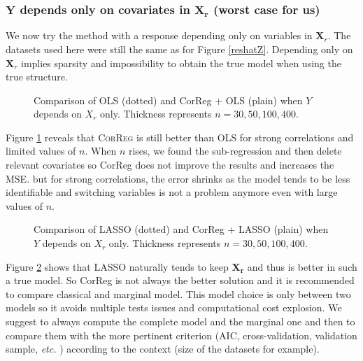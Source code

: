 \documentclass[11pt,a4paper]{article}
\begin{document}
\FloatBarrier
	\subsubsection{$\boldsymbol{Y}$ depends only on covariates in $\boldsymbol{X_r}$ (worst case for us)}	 \label{tableMSEsimgauche}
We now try the method with a response depending only on variables in $\boldsymbol{X}_r$. The datasets used here were still the same as for Figure \ref{reshatZ}.
Depending only on $\boldsymbol{X}_r$ implies sparsity and impossibility to obtain the true model when using the true structure. 
\begin{figure}[h!]
	 \quad
	\caption{Comparison of OLS (dotted) and CorReg + OLS (plain) when $Y$ depends on $X_r$ only. Thickness represents $n=30,50,100,400$.}\label{X2OLS}
\end{figure}
 
Figure \ref{X2OLS} reveals that \textsc{CorReg} is still better than OLS for strong correlations and limited values of $n$. When $n$ rises, we found the sub-regression and then delete relevant covariates so CorReg does not improve the results and increases the MSE. but for strong correlations, the error shrinks as the model tends to be less identifiable and switching variables is not a problem anymore even with large values of $n$.

\begin{figure}[h!]
	 \quad
	\caption{Comparison of LASSO (dotted) and CorReg + LASSO (plain) when $Y$ depends on $X_r$ only. Thickness represents $n=30,50,100,400$.}\label{X2LASSO}
\end{figure}
Figure \ref{X2LASSO} shows that LASSO naturally tends to keep $\boldsymbol{X_r}$ and thus is better in such a true model. So CorReg is not always the better solution and it is recommended to compare classical and marginal model. This model choice is only between two models so it avoids multiple tests issues and computational cost explosion. We suggest to always compute the complete model and the marginal one and then to compare them with the more pertinent criterion (AIC, cross-validation, validation sample, {\it etc. }) according to the context (size of the datasets for example).
\end{document}
